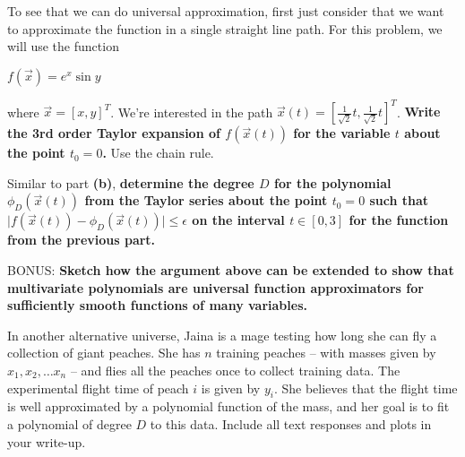 \begin{Parts}
\Part To see that we can do universal approximation, first just consider that we want to approximate the function in a single straight line path.  For this problem, we will use the function

$f(\vec{x})=e^{x}\sin y$

\noindent where $\vec{x}=[x,y]^T$.  We're interested in the path $\vec{x}(t)=[\frac{1}{\sqrt{2}}t,\frac{1}{\sqrt{2}}t]^T$.  {\bf Write the 3rd order Taylor expansion of $f(\vec{x}(t))$ for the variable $t$ about the point $t_0=0$.} Use the chain rule. 

\Part Similar to part \textbf{(b)}, {\bf determine the degree $D$ for the polynomial $\phi_D(\vec{x}(t))$ from the Taylor series about the point $t_0=0$ such that $\lvert f(\vec{x}(t)) - \phi_D(\vec{x}(t))\rvert \leq \epsilon$ on the interval $t \in [0, 3]$ for the function from the previous part.}

\Part BONUS: {\bf Sketch how the argument above can be extended to show that multivariate polynomials are universal function approximators for sufficiently smooth functions of many variables.}

\end{Parts}


In another alternative universe, Jaina is a mage testing how long she can fly a collection of giant peaches. She has $n$ training peaches -- with masses given by $x_1, x_2, \ldots x_n$ -- and flies all the peaches once to collect training data. The experimental flight time of peach $i$ is given by $y_i$. She believes that the flight time is well approximated by a polynomial function of the mass, and her goal is to fit a polynomial of degree $D$ to this data. Include all text responses and plots in your write-up.

